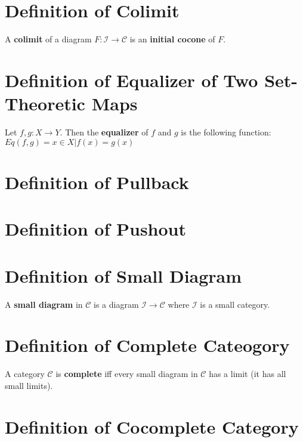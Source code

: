 \documentclass[a4paper, twoside, english, 11pt]{book}
\newcommand{\C}{\mathcal C}
\newcommand{\I}{\mathcal I}
\begin{document}
\section{Definition of Colimit}

A \textbf{colimit} of a diagram $F : \I \rightarrow \C$ is an \textbf{initial cocone} of $F$.



\section{Definition of Equalizer of Two Set-Theoretic Maps}

Let $f, g : X \rightarrow Y$. Then the \textbf{equalizer} of $f$ and $g$ is the following function: \\

$Eq(f, g) = {x \in X | f(x) = g(x)}$



\section{Definition of Pullback}



\section{Definition of Pushout}



\section{Definition of Small Diagram}

A \textbf{small diagram} in $\C$ is a diagram $\I \rightarrow \C$ where $\I$ is a small category.



\section{Definition of Complete Cateogory}

A category $\C$ is \textbf{complete} iff every small diagram in $\C$ has a limit (it has all small limits).



\section{Definition of Cocomplete Category}
\end{document}

